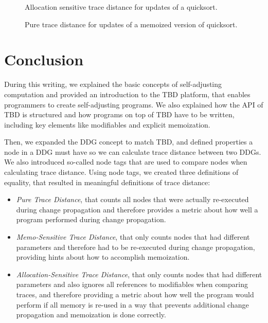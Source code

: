 \begin{figure}
  \centering
  \caption[margin=5]{Allocation sensitive trace distance for updates of a quicksort.}
  \label{plot:quicksort_alloc}
\end{figure}

\begin{figure}
  \centering
  \caption[margin=5]{Pure trace distance for updates of a memoized version of quicksort.}
  \label{plot:memo_quicksort_pure}
\end{figure}

\chapter{Conclusion}

During this writing, we explained the basic concepts of self-adjusting computation and provided an introduction to the TBD platform, that enables programmers to create self-adjusting programs. We also explained how the API of TBD is structured and how programs on top of TBD have to be written, including key elements like modifiables and explicit memoization. 

Then, we expanded the DDG concept to match TBD, and defined properties a node in a DDG must have so we can calculate trace distance between two DDGs. We also introduced so-called node tags that are used to compare nodes when calculating trace distance. Using node tags, we created three definitions of equality, that resulted in meaningful definitions of trace distance: 

\begin{itemize}
\item \textit{Pure Trace Distance}, that counts all nodes that were actually re-executed during change propagation and therefore provides a metric about how well a program performed during change propagation. 
\item \textit{Memo-Sensitive Trace Distance}, that only counts nodes that had different parameters and therefore had to be re-executed during change propagation, providing hints about how to accomplish memoization. 
\item \textit{Allocation-Sensitive Trace Distance}, that only counts nodes that had different parameters and also ignores all references to modifiables when comparing traces, and therefore providing a metric about how well the program would perform if all memory is re-used in a way that prevents additional change propagation and memoization is done correctly. 
\end{itemize} 


